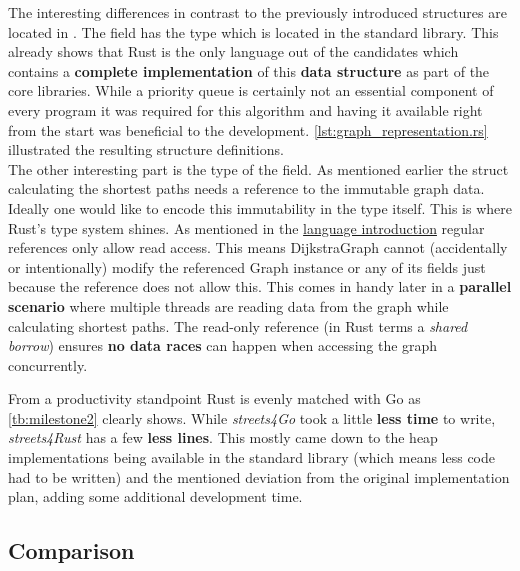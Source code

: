 The interesting differences in contrast to the previously introduced structures are located in . The  field has the type  which is located in the standard library. This already shows that Rust is the only language out of the candidates which contains a \textbf{complete implementation} of this \textbf{data structure} as part of the core libraries. While a priority queue is certainly not an essential component of every program it was required for this algorithm and having it available right from the start was beneficial to the development. \autoref{lst:graph_representation.rs} illustrated the resulting structure definitions.
\\


The other interesting part is the type of the  field. As mentioned earlier the struct calculating the shortest paths needs a reference to the immutable graph data. Ideally one would like to encode this immutability in the type itself. This is where Rust's type system shines. As mentioned in the \hyperref[subsec:State_of_the_art::Candidates::Rust]{language introduction} regular references only allow read access. This means DijkstraGraph cannot (accidentally or intentionally) modify the referenced Graph instance or any of its fields just because the reference does not allow this. This comes in handy later in a \textbf{parallel scenario} where multiple threads are reading data from the graph while calculating shortest paths. The read-only reference (in Rust terms a \textit{shared borrow}) ensures \textbf{no data races} can happen when accessing the graph concurrently.

From a productivity standpoint Rust is evenly matched with Go as \autoref{tb:milestone2} clearly shows. While \textit{streets4Go} took a little \textbf{less time} to write, \textit{streets4Rust} has a few \textbf{less lines}. This mostly came down to the heap implementations being available in the standard library (which means less code had to be written) and the mentioned deviation from the original implementation plan, adding some additional development time.

\subsection{Comparison}
\label{subsec:Implementation::Graph_Representation::Comparison}

